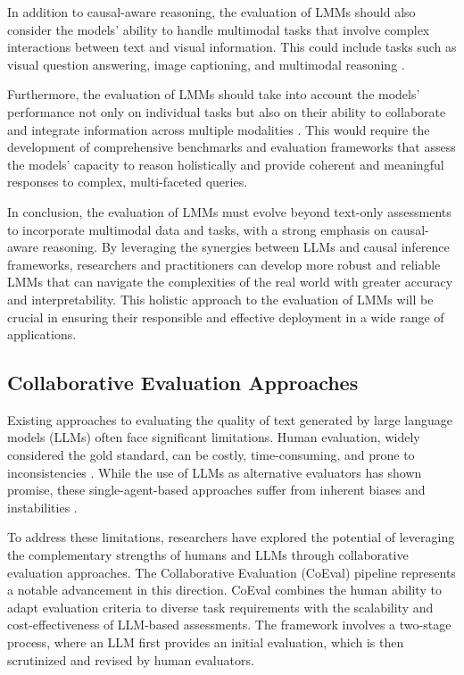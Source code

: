 \documentclass[11pt]{article}
\begin{document}
In addition to causal-aware reasoning, the evaluation of LMMs should also consider the models' ability to handle multimodal tasks that involve complex interactions between text and visual information. This could include tasks such as visual question answering, image captioning, and multimodal reasoning \cite{ref353,ref354}.

Furthermore, the evaluation of LMMs should take into account the models' performance not only on individual tasks but also on their ability to collaborate and integrate information across multiple modalities \cite{ref66,ref349}. This would require the development of comprehensive benchmarks and evaluation frameworks that assess the models' capacity to reason holistically and provide coherent and meaningful responses to complex, multi-faceted queries.

In conclusion, the evaluation of LMMs must evolve beyond text-only assessments to incorporate multimodal data and tasks, with a strong emphasis on causal-aware reasoning. By leveraging the synergies between LLMs and causal inference frameworks, researchers and practitioners can develop more robust and reliable LMMs that can navigate the complexities of the real world with greater accuracy and interpretability. This holistic approach to the evaluation of LMMs will be crucial in ensuring their responsible and effective deployment in a wide range of applications.

\subsection{Collaborative Evaluation Approaches}

Existing approaches to evaluating the quality of text generated by large language models (LLMs) often face significant limitations. Human evaluation, widely considered the gold standard, can be costly, time-consuming, and prone to inconsistencies \cite{ref66}. While the use of LLMs as alternative evaluators has shown promise, these single-agent-based approaches suffer from inherent biases and instabilities \cite{ref131,ref129}.

To address these limitations, researchers have explored the potential of leveraging the complementary strengths of humans and LLMs through collaborative evaluation approaches. The Collaborative Evaluation (CoEval) pipeline \cite{ref66} represents a notable advancement in this direction. CoEval combines the human ability to adapt evaluation criteria to diverse task requirements with the scalability and cost-effectiveness of LLM-based assessments. The framework involves a two-stage process, where an LLM first provides an initial evaluation, which is then scrutinized and revised by human evaluators.
\end{document}
